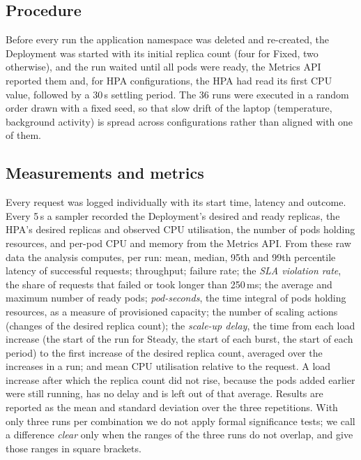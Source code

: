\documentclass[conference,a4paper]{IEEEtran}
\begin{document}
\subsection{Procedure}
Before every run the application namespace was deleted and re-created, the
Deployment was started with its initial replica count (four for Fixed, two
otherwise), and the run waited until all pods were ready, the Metrics API
reported them and, for HPA configurations, the HPA had read its first CPU
value, followed by a 30\,s settling period. The 36 runs were executed in a
random order drawn with a fixed seed, so that slow drift of the laptop
(temperature, background activity) is spread across configurations rather
than aligned with one of them.

\subsection{Measurements and metrics}
Every request was logged individually with its start time, latency and
outcome. Every 5\,s a sampler recorded the Deployment's desired and ready
replicas, the HPA's desired replicas and observed CPU utilisation, the number
of pods holding resources, and per-pod CPU and memory from the Metrics API.
From these raw data the analysis computes, per run: mean, median, 95th and
99th percentile latency of successful requests; throughput; failure rate; the
\emph{SLA violation rate}, the share of requests that failed or took longer
than 250\,ms; the average and maximum number of ready pods;
\emph{pod-seconds}, the time integral of pods holding resources, as a measure
of provisioned capacity; the number of scaling actions (changes of the desired
replica count); the \emph{scale-up delay}, the time from each load increase
(the start of the run for Steady, the start of each burst, the start of each
period) to the first increase of the desired replica count, averaged over the
increases in a run; and mean CPU utilisation relative to the request. A load
increase after which the replica count did not rise, because the pods added
earlier were still running, has no delay and is left out of that average.
Results are reported as the mean and standard deviation over the three
repetitions. With only three runs per combination we do not apply formal
significance tests; we call a difference \emph{clear} only when the ranges of
the three runs do not overlap, and give those ranges in square brackets.
\end{document}
